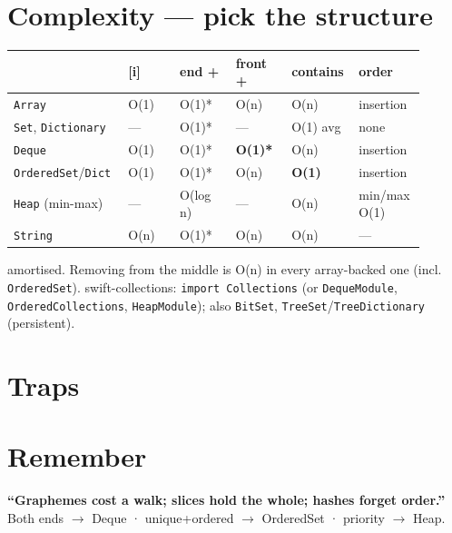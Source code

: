 \documentclass[8pt]{extarticle}
\begin{document}
\begin{multicols}{2}
\section{Complexity — pick the structure}
{\scriptsize
\begin{tabular}{@{}L{0.25\linewidth}L{0.12\linewidth}L{0.13\linewidth}L{0.13\linewidth}L{0.13\linewidth}L{0.14\linewidth}@{}}
\toprule
 & \textbf{[i]} & \textbf{end +} & \textbf{front +} & \textbf{contains} & \textbf{order} \\ \midrule
\texttt{Array} & O(1) & O(1)* & O(n) & O(n) & insertion \\
\texttt{Set}, \texttt{Dictionary} & — & O(1)* & — & O(1) avg & none \\
\texttt{Deque} & O(1) & O(1)* & \textbf{O(1)*} & O(n) & insertion \\
\texttt{OrderedSet}/\texttt{Dict} & O(1) & O(1)* & O(n) & \textbf{O(1)} & insertion \\
\texttt{Heap} (min-max) & — & O(log n) & — & O(n) & min/max O(1) \\
\texttt{String} & O(n) & O(1)* & O(n) & O(n) & — \\
\bottomrule
\end{tabular}}\pdfonly{\\[1pt]}
{\scriptsize * amortised. Removing from the middle is O(n) in every array-backed one
(incl. \texttt{OrderedSet}). swift-collections:
\texttt{import Collections} (or \texttt{DequeModule}, \texttt{OrderedCollections},
\texttt{HeapModule}); also \texttt{BitSet}, \texttt{TreeSet}/\texttt{TreeDictionary} (persistent).}

\section{Traps}
\begin{itemize}
\end{itemize}

\section{Remember}
\textbf{``Graphemes cost a walk; slices hold the whole; hashes forget order.''}
Both ends $\to$ Deque · unique+ordered $\to$ OrderedSet · priority $\to$ Heap.


\end{multicols}

\end{document}
